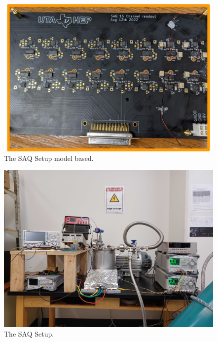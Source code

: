\begin{figure}[]
\centering
\includegraphics[width=\textwidth]{images/SAQ_16_ivc_readout_board.pdf}
\caption{The SAQ Setup model based.}
\label{fig:saq_readout_board}
\end{figure}

\begin{figure}[]
\centering
\includegraphics[width=\textwidth]{images/SAQ_physical_setup.jpg}
\caption{The SAQ Setup.}
\label{fig:saq_setup_flatten}
\end{figure}

